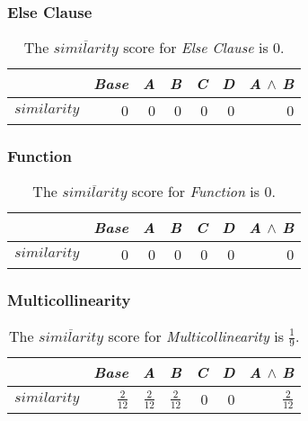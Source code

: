 \subsubsection*{Else Clause}

\begin{table}[H]
    \centering
    \begin{tabular}{lrrrrrr}    \toprule
               & \emph{Base} & \emph{A} & \emph{B} & \emph{C} & \emph{D} & \emph{A} $\land$ \emph{B}   \\ \midrule
    $similarity$ & 0 & 0 & 0 & 0 & 0 & 0      \\ \bottomrule
    \end{tabular}
    \caption{The $\overline{similarity}$ score for \emph{Else Clause} is $0$.}
\end{table}

\subsubsection*{Function}

\begin{table}[H]
    \centering
    \begin{tabular}{lrrrrrr}    \toprule
               & \emph{Base} & \emph{A} & \emph{B} & \emph{C} & \emph{D} & \emph{A} $\land$ \emph{B}   \\ \midrule
    $similarity$ & 0 & 0 & 0 & 0 & 0 & 0      \\ \bottomrule
    \end{tabular}
    \caption{The $\overline{similarity}$ score for \emph{Function} is $0$.}
\end{table}
    
\subsubsection*{Multicollinearity}

\begin{table}[H]
    \centering
    \begin{tabular}{lrrrrrr}    \toprule
               & \emph{Base} & \emph{A} & \emph{B} & \emph{C} & \emph{D} & \emph{A} $\land$ \emph{B}   \\ \midrule
    $similarity$ & $\frac{2}{12}$ & $ \frac{2}{12}$ &  $\frac{2}{12}$ & 0 & 0 &  $\frac{2}{12}$      \\ \bottomrule
    \end{tabular}
    \caption{The $\overline{similarity}$ score for \emph{Multicollinearity} is $\frac{1}{9}$.}
\end{table}


